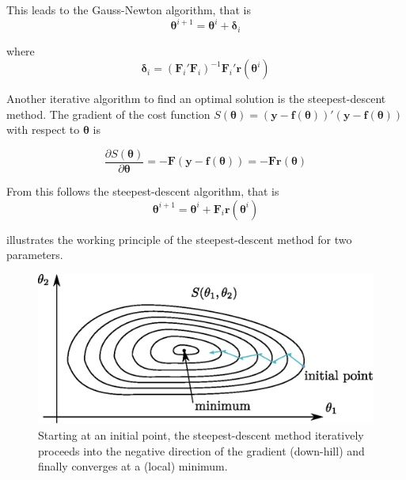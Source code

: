 This leads to the Gauss-Newton algorithm, that is
\begin{equation}
\boldsymbol{\theta}^{i+1} =
\boldsymbol{\theta}^{i} + \boldsymbol{\delta}_i
\end{equation}

where
\begin{equation}
\label{eq:gauss_newton_step}
\boldsymbol{\delta}_i = (\mathbf{F}_i' \mathbf{F}_i)^{-1} \mathbf{F}_i' \mathbf{r}(\boldsymbol{\theta}^{i})
\end{equation}

Another iterative algorithm to find an optimal solution is the steepest-descent method.
The gradient of the cost function 
$S(\boldsymbol{\theta}) = ( \mathbf{y} - \mathbf{f}(\boldsymbol{\theta}) )'
( \mathbf{y} - \mathbf{f}(\boldsymbol{\theta}) )$
with respect to $\boldsymbol{\theta}$ is

\begin{equation}
\frac{\partial S(\boldsymbol{\theta})}{\partial \boldsymbol{\theta}} = 
- \mathbf{F} ( \mathbf{y} - \mathbf{f}(\boldsymbol{\theta}) ) = 
- \mathbf{F}  \mathbf{r}(\boldsymbol{\theta}) 
\end{equation}

From this follows the steepest-descent algorithm, that is
\begin{equation}
\boldsymbol{\theta}^{i+1} =
\boldsymbol{\theta}^{i} +
\mathbf{F}_i \mathbf{r}(\boldsymbol{\theta}^{i})
\end{equation}

 illustrates the working principle of the steepest-descent method for two parameters.

\begin{figure}[hbtp]
\centering
\includegraphics[width = 0.6 \textwidth]{images/steepest_descent.eps}
\caption{Starting at an initial point, the steepest-descent method iteratively proceeds into the negative direction of the gradient (down-hill) and finally converges at a (local) minimum.}
\label{fig:steepest_descent}
\end{figure}



